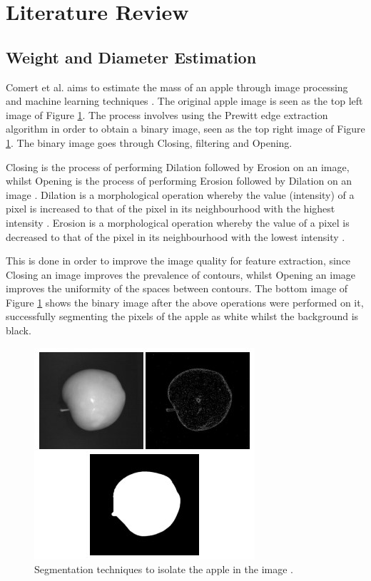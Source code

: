 \documentclass[conference]{IEEEtran}
\begin{document}
\section{Literature Review}
\subsection{Weight and Diameter Estimation}
Comert et al. aims to estimate the mass of an apple through image processing and machine learning techniques \cite{comert}.
The original apple image is seen as the top left image of Figure \ref{fig:segmentedapples}.
The process involves using the Prewitt edge extraction algorithm in order to obtain a binary image, seen as the top right image of Figure \ref{fig:segmentedapples}.
The binary image goes through Closing, filtering and Opening.

Closing is the process of performing Dilation followed by Erosion on an image, whilst Opening is the process of performing Erosion followed by Dilation on an image \cite{opening,closing}.
Dilation is a morphological operation whereby the value (intensity) of a pixel is increased to that of the pixel in its neighbourhood with the highest intensity \cite{mathworksdilationerosion}.
Erosion is a morphological operation whereby the value of a pixel is decreased to that of the pixel in its neighbourhood with the lowest intensity \cite{mathworksdilationerosion}.

This is done in order to improve the image quality for feature extraction, since Closing an image improves the prevalence of contours, whilst Opening an image improves the uniformity of the spaces between contours.
The bottom image of Figure \ref{fig:segmentedapples} shows the binary image after the above operations were performed on it, successfully segmenting the pixels of the apple as white whilst the background is black.

\begin{figure}
    \centering
    \includegraphics[width=0.7\linewidth]{segmentedapples.jpg}
    \caption{Segmentation techniques to isolate the apple in the image \cite{comert}.}
    \label{fig:segmentedapples}
\end{figure}
\end{document}
